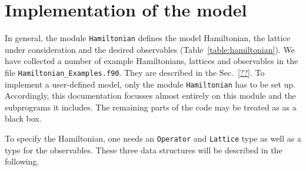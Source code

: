 \section{Implementation of the model} \label{sec:imp}
In general, the module \texttt{Hamiltonian} defines the model Hamiltonian, the lattice under consideration and the desired observables (Table~\ref{table:hamiltonian}). 
We have collected a number of example Hamiltonians, lattices and observables in the file  \texttt{Hamiltonian\_Examples.f90}.  They are described in the Sec.~\ref{??}.
To implement a user-defined model, only the module \texttt{Hamil}\texttt{tonian} has to be set up. Accordingly, this documentation focusses almost entirely  on this module and the subprograms it includes. 
The remaining parts of the code may be treated as as a black box.  

To specify the Hamiltonian, one needs  an  \texttt{Operator} and \texttt{Lattice} type as well as a type for the observables. These three data structures will be described in the following. 


